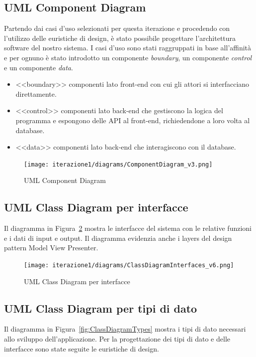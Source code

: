 \subsection{UML Component Diagram}
Partendo dai casi d'uso selezionati per questa iterazione e procedendo con l'utilizzo delle euristiche di design, è stato possibile progettare l'architettura software del nostro sistema. I casi d'uso sono stati raggruppati in base all'affinità e per ognuno è stato introdotto un componente \textit{boundary}, un componente \textit{control} e un componente \textit{data}. 

\begin{itemize}
    \item <<boundary>> componenti lato front-end con cui gli attori si interfacciano direttamente. 
    \item <<control>>  componenti lato back-end che gestiscono la logica del programma e espongono delle API al front-end, richiedendone a loro volta al database.
    \item <<data>> componenti lato back-end che interagiscono con il database.
\end{itemize}

\begin{figure}[htbp]
    \texttt{[image: iterazione1/diagrams/ComponentDiagram\_v3.png]}
    \centering
    \caption{UML Component Diagram}\label{fig:componentDiagram}
\end{figure}

\newpage

\subsection{UML Class Diagram per interfacce}
Il diagramma in Figura~\ref{fig:ClassDiagramInterfaces} mostra le interfacce del sistema con le relative funzioni e i dati di input e output. Il diagramma evidenzia anche i layers del design pattern Model View Presenter.

\begin{figure}[htbp]
    \texttt{[image: iterazione1/diagrams/ClassDiagramInterfaces\_v6.png]}
    \centering
    \caption{UML Class Diagram per interfacce}
    \label{fig:ClassDiagramInterfaces}
\end{figure}

\newpage

\subsection{UML Class Diagram per tipi di dato}
Il diagramma in Figura~\ref{fig:ClassDiagramTypes} mostra i tipi di dato necessari allo sviluppo dell'applicazione. Per la progettazione dei tipi di dato e delle interfacce sono state seguite le euristiche di design. 

